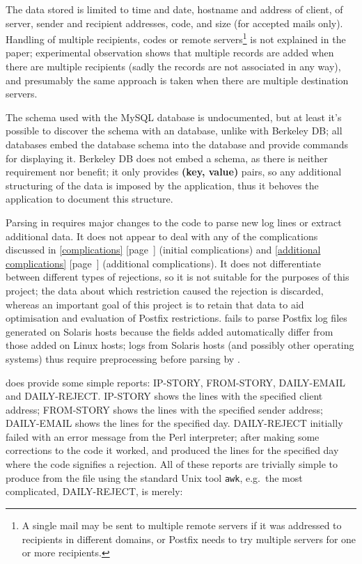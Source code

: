 \documentclass[a4paper,12pt,draft]{article}
\newcommand{\refwithpage}[1]{%
    \empty{}\ref{#1} [page~\pageref{#1}]%
}
\newcommand{\sectionref}[1]{%
    \textsection{}\refwithpage{#1}%
}
\begin{document}
The data stored is limited to time and date, hostname and \IP{} address of
client, \IP{} of server, sender and recipient addresses, \SMTP{} code, and
size (for accepted mails only).  Handling of multiple recipients, \SMTP{}
codes or remote servers\footnote{A single mail may be sent to multiple
remote servers if it was addressed to recipients in different domains, or
Postfix needs to try multiple servers for one or more recipients.} is not
explained in the paper; experimental observation shows that multiple
records are added when there are multiple recipients (sadly the records are
not associated in any way), and presumably the same approach is taken when
there are multiple destination servers.

The schema used with the MySQL database is undocumented, but at least it's
possible to discover the schema with an \SQL{} database, unlike with
Berkeley DB\@; all \SQL{} databases embed the database schema into the
database and provide commands for displaying it.  Berkeley DB does not
embed a schema, as there is neither requirement nor benefit; it only
provides \textbf{(key, value)} pairs, so any additional structuring of the
data is imposed by the application, thus it behoves the application to
document this structure.

Parsing in \LMA{} requires major changes to the code to parse new log lines
or extract additional data.  It does not appear to deal with any of the
complications discussed in \sectionref{complications} (initial
complications) and \sectionref{additional complications} (additional
complications).  It does not differentiate between different types of
rejections, so it is not suitable for the purposes of this project; the
data about which restriction caused the rejection is discarded, whereas an
important goal of this project is to retain that data to aid optimisation
and evaluation of Postfix restrictions.  \LMA{} fails to parse Postfix log
files generated on Solaris hosts because the fields added automatically
differ from those added on Linux hosts; logs from Solaris hosts (and
possibly other operating systems) thus require preprocessing before parsing
by \LMA{}.

\LMA{} does provide some simple reports: IP-STORY, FROM-STORY, DAILY-EMAIL
and DAILY-REJECT\@.  IP-STORY shows the \CSV{} lines with the specified
client \IP{} address; FROM-STORY shows the \CSV{} lines with the specified
sender address; DAILY-EMAIL shows the \CSV{} lines for the specified day.
DAILY-REJECT initially failed with an error message from the Perl
interpreter; after making some corrections to the code it worked, and
produced the \CSV{} lines for the specified day where the \SMTP{} code
signifies a rejection.  All of these reports are trivially simple to
produce from the \CSV{} file using the standard Unix tool \texttt{awk},
e.g.\ the most complicated, DAILY-REJECT, is merely:
\end{document}
